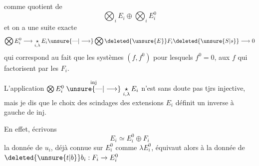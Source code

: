 comme quotient de
\[
\bigotimes_i E_i \oplus \bigotimes_i E_i^0
\]
et on a une suite exacte
\[
\bigotimes E_i^0 \longrightarrow \mathop{\star}\limits_{i,\lambda} E_i \unsure{\text{---}|\longrightarrow} \bigotimes \deleted{\unsure{E}}F_i\deleted{\unsure{S|s}}\longrightarrow 0
\]
qui correspond au fait que les systèmes $(f,f^0)$ pour lesquels $f^0=0$,  aux $f$ qui  factorisent par les $F_i$.

L'application $\bigotimes E_i^0 \mathrel{\overset{\mathrm{inj}}{\unsure{\text{---}|\longrightarrow}}} \mathop{\star}\limits_{i,\lambda} E_i$ n'est sans doute pas tjrs injective, mais je dis que le choix des scindages des extensions $E_i$ définit un inverse à gauche de $\mathrm{inj}$.

En effet, écrivons
\[
E_i \simeq E_i^0\oplus F_i
\]
la donnée de $u_i$, déjà connue sur $E_i^0$ comme $\lambda E_i^0$, équivaut alors à la donnée de $\deleted{\unsure{t|b}}b_i:F_i \to E_i^0$
